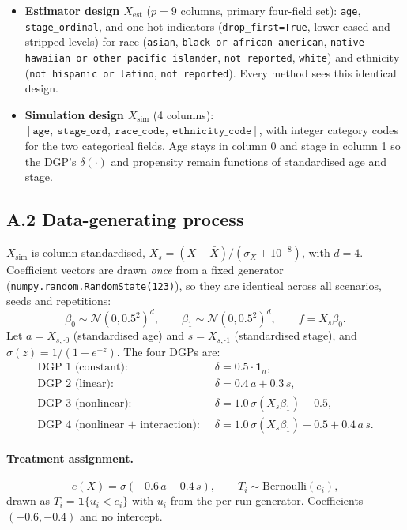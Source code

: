\begin{itemize}\tightlist
\item \textbf{Estimator design $X_{\mathrm{est}}$} ($p = 9$ columns, primary
four-field set): \texttt{age}, \texttt{stage\_ordinal}, and one-hot indicators
(\texttt{drop\_first=True}, lower-cased and stripped levels) for race
(\texttt{asian}, \texttt{black or african american},
\texttt{native hawaiian or other pacific islander}, \texttt{not reported},
\texttt{white}) and ethnicity (\texttt{not hispanic or latino},
\texttt{not reported}). Every method sees this identical design.
\item \textbf{Simulation design $X_{\mathrm{sim}}$} (4 columns):
$[\texttt{age},\ \texttt{stage\_ord},\ \texttt{race\_code},\
\texttt{ethnicity\_code}]$, with integer category codes for the two
categorical fields. Age stays in column 0 and stage in column 1 so the DGP's
$\delta(\cdot)$ and propensity remain functions of standardised age and stage.
\end{itemize}

\subsection*{A.2 Data-generating process}

$X_{\mathrm{sim}}$ is column-standardised,
$X_s = (X - \bar{X}) / (\sigma_X + 10^{-8})$, with $d = 4$. Coefficient vectors
are drawn \emph{once} from a fixed generator
(\texttt{numpy.random.RandomState(123)}), so they are identical across all
scenarios, seeds and repetitions:
\[
\beta_0 \sim \mathcal{N}(0, 0.5^2)^{d},\qquad
\beta_1 \sim \mathcal{N}(0, 0.5^2)^{d},\qquad
f = X_s\beta_0 .
\]
Let $a = X_{s,\cdot 0}$ (standardised age) and $s = X_{s,\cdot 1}$
(standardised stage), and $\sigma(z) = 1/(1+e^{-z})$. The four DGPs are:
\[
\begin{aligned}
\text{DGP 1 (constant): } &\ \delta = 0.5\cdot\mathbf{1}_n,\\
\text{DGP 2 (linear): } &\ \delta = 0.4\,a + 0.3\,s,\\
\text{DGP 3 (nonlinear): } &\ \delta = 1.0\,\sigma(X_s\beta_1) - 0.5,\\
\text{DGP 4 (nonlinear + interaction): } &\ \delta = 1.0\,\sigma(X_s\beta_1) - 0.5 + 0.4\,a\,s.
\end{aligned}
\]

\paragraph{Treatment assignment.}
\[
e(X) = \sigma(-0.6\,a - 0.4\,s),\qquad T_i \sim \mathrm{Bernoulli}(e_i),
\]
drawn as $T_i = \mathbf{1}\{u_i < e_i\}$ with $u_i$ from the per-run generator.
Coefficients $(-0.6, -0.4)$ and no intercept.

